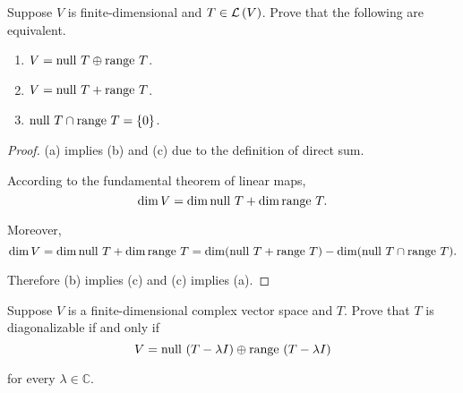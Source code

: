 \begin{exercise}
    Suppose $V$ is finite-dimensional and $T\in\mathcal{L}\left({V}\right)$. Prove that the following are equivalent.
    \begin{enumerate}[label={(\alph*)}]
        \item $V = \operatorname{null}\,{T}\oplus \operatorname{range}\,{T}$.
        \item $V = \operatorname{null}\,{T} + \operatorname{range}\,{T}$.
        \item $\operatorname{null}\,{T}\cap \operatorname{range}\,{T} = \{0\}$.
    \end{enumerate}
\end{exercise}

\begin{proof}
    (a) implies (b) and (c) due to the definition of direct sum.

    According to the fundamental theorem of linear maps,
    \[
        \dim V = \dim\operatorname{null}\,{T} + \dim\operatorname{range}\,{T}.
    \]

    Moreover,
    \[
        \dim V = \dim\operatorname{null}\,{T} + \dim\operatorname{range}\,{T} = \dim (\operatorname{null}\,{T} + \operatorname{range}\,{T}) - \dim (\operatorname{null}\,{T}\cap\operatorname{range}\,{T}).
    \]

    Therefore (b) implies (c) and (c) implies (a).
\end{proof}
\newpage

\begin{exercise}
    Suppose $V$ is a finite-dimensional complex vector space and $T$. Prove that $T$ is diagonalizable if and only if
    \[
        V = \operatorname{null}\,{(T - \lambda I)} \oplus \operatorname{range}\,{(T - \lambda I)}
    \]

    for every $\lambda\in\mathbb{C}$.
\end{exercise}

